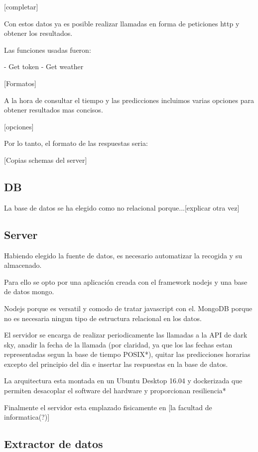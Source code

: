 [completar]

Con estos datos ya es posible realizar llamadas en forma de peticiones http y obtener los resultados.

Las funciones usadas fueron:

- Get token
- Get weather

[Formatos]

A la hora de consultar el tiempo y las predicciones incluimos varias opciones para obtener resultados mas concisos.

[opciones]

Por lo tanto, el formato de las respuestas seria:

[Copias schemas del server]


\subsection{DB} 
\label{sub:DB}

La base de datos se ha elegido como no relacional porque...[explicar otra vez]

\subsection{Server} 
\label{sub:server}

Habiendo elegido la fuente de datos, es necesario automatizar la recogida y su almacenado.

Para ello se opto por una aplicación creada con el framework nodejs y una base de datos mongo.

Nodejs porque es versatil y comodo de tratar javascript con el.
MongoDB porque no es necesaria ningun tipo de estructura relacional en los datos.

El servidor se encarga de realizar periodicamente las llamadas a la API de dark sky, anadir la fecha de la llamada (por claridad, ya que los las fechas estan representadas segun la base de tiempo POSIX*), quitar las predicciones horarias excepto del principio del dia e insertar las respuestas en la base de datos.

La arquitectura esta montada en un Ubuntu Desktop 16.04 y dockerizada que permiten desacoplar el software del hardware y proporcionan resiliencia*

Finalmente el servidor esta emplazado fisicamente en [la facultad de informatica(?)] 



\subsection{Extractor de datos} 
\label{sub:extractor_de_datos}

